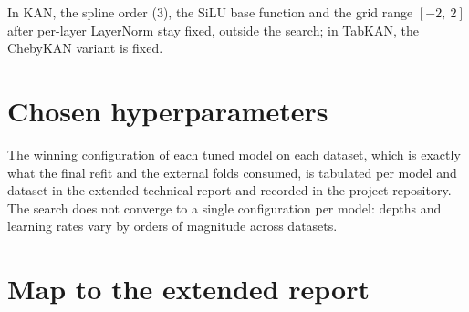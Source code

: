 In KAN, the spline order ($3$), the SiLU base function and the grid
range $[-2,\ 2]$ after per-layer LayerNorm stay fixed, outside the
search; in TabKAN, the ChebyKAN variant is fixed.

\clearpage
\section{Chosen hyperparameters}
\label{app:hp-escolhidos}

The winning configuration of each tuned model on each dataset,
which is exactly what the final refit and the external folds consumed, is
tabulated per model and dataset in the extended technical report and
recorded in the project repository. The search does not converge to a
single configuration per model: depths and learning rates vary by
orders of magnitude across datasets.

\section{Map to the extended report}
\label{app:mapa}

